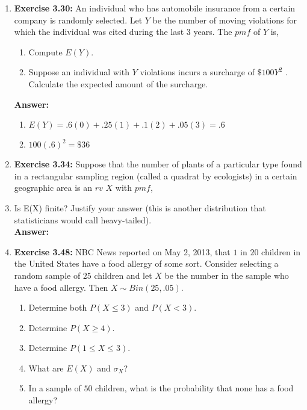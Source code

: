 \documentclass[12pt]{article}
\theoremstyle{homework}
\begin{document}
\begin{enumerate}



\item\hspace{.5in}\textbf{Exercise 3.30:} An individual who has automobile insurance from a certain company is randomly selected. Let $Y$ be the number of moving violations for which the individual was cited during the last $3$ years. The $pmf$ of $Y$ is,

\begin{enumerate}
\item Compute $E(Y)$.
\item Suppose an individual with $Y$ violations incurs a
surcharge of $\$100Y^2$ . Calculate the expected amount
of the surcharge.
\end{enumerate}

\textbf{Answer:} 
\begin{enumerate}
\item $E(Y)=.6(0)+.25(1)+.1(2)+.05(3)=.6$
\item $100(.6)^2=\$36$
\end{enumerate}

\vspace{.5in}





\item\hspace{.5in}\textbf{Exercise 3.34:} Suppose that the number of plants of a particular type found in a rectangular sampling region (called a quadrat by ecologists) in a certain geographic area is an $rv$ $X$ with $pmf$,
\item 
Is E(X) finite? Justify your answer (this is another distribution that statisticians would call heavy-tailed).\\

\textbf{Answer:} 
\vspace{.5in}







\item\hspace{.5in}\textbf{Exercise 3.48:} NBC News reported on May 2, 2013, that $1$ in $20$ children in the United States have a food allergy of some sort. Consider selecting a random sample of $25$ children and let $X$ be the number in the sample who have a food allergy. Then $X\sim Bin(25, .05)$.
\begin{enumerate}
\item Determine both $P(X \le 3)$ and $P(X < 3)$.
\item Determine $P(X \ge 4)$.
\item Determine $P(1 \le X \le 3)$.
\item What are $E(X)$ and $\sigma_X$?
\item In a sample of $50$ children, what is the probability that none has a food allergy?
\end{enumerate}


\end{enumerate}
\end{document}
